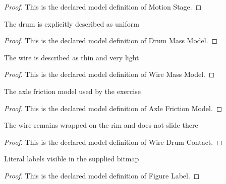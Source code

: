 \begin{proof}
  This is the declared model definition of Motion Stage.
\end{proof}
\begin{definition}
  \label{def:physics:phyx-mini-0773:phyxminiproblems-problemphyxmini0773-drummassmodel}
  The drum is explicitly described as uniform
\end{definition}
\begin{proof}
  This is the declared model definition of Drum Mass Model.
\end{proof}
\begin{definition}
  \label{def:physics:phyx-mini-0773:phyxminiproblems-problemphyxmini0773-wiremassmodel}
  The wire is described as thin and very light
\end{definition}
\begin{proof}
  This is the declared model definition of Wire Mass Model.
\end{proof}
\begin{definition}
  \label{def:physics:phyx-mini-0773:phyxminiproblems-problemphyxmini0773-axlefrictionmodel}
  The axle friction model used by the exercise
\end{definition}
\begin{proof}
  This is the declared model definition of Axle Friction Model.
\end{proof}
\begin{definition}
  \label{def:physics:phyx-mini-0773:phyxminiproblems-problemphyxmini0773-wiredrumcontact}
  The wire remains wrapped on the rim and does not slide there
\end{definition}
\begin{proof}
  This is the declared model definition of Wire Drum Contact.
\end{proof}
\begin{definition}
  \label{def:physics:phyx-mini-0773:phyxminiproblems-problemphyxmini0773-figurelabel}
  Literal labels visible in the supplied bitmap
\end{definition}
\begin{proof}
  This is the declared model definition of Figure Label.
\end{proof}
